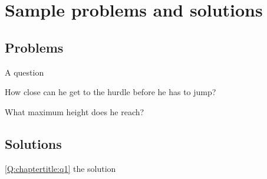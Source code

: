 \newpage
\section{Sample problems and solutions}
\subsection{Problems}
\begin{problemParts}{A question\label{Q:chaptertitle:q1}}
\item How close can he get to the hurdle before he has to jump?
\item What maximum height does he reach?
\end{problemParts}

\newpage
\subsection{Solutions}
\begin{solution}{\ref{Q:chaptertitle:q1}}
{
the solution
}
\end{solution}

